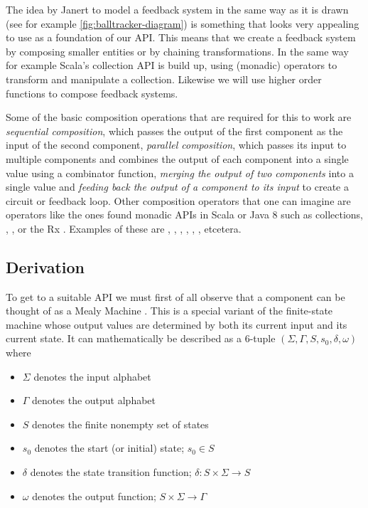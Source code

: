 The idea by Janert to model a feedback system in the same way as it is drawn (see for example \cref{fig:balltracker-diagram}) is something that looks very appealing to use as a foundation of our API. This means that we create a feedback system by composing smaller entities or by chaining transformations. In the same way for example Scala's collection API is build up, using (monadic) operators to transform and manipulate a collection. Likewise we will use higher order functions to compose feedback systems.

Some of the basic composition operations that are required for this to work are \textit{sequential composition}, which passes the output of the first component as the input of the second component, \textit{parallel composition}, which passes its input to multiple components and combines the output of each component into a single value using a combinator function, \textit{merging the output of two components} into a single value and \textit{feeding back the output of a component to its input} to create a circuit or feedback loop. Other composition operators that one can imagine are operators like the ones found monadic APIs in Scala or Java 8 such as collections, , ,  or the Rx \obs. Examples of these are , , , , , , etcetera.

\subsection{Derivation}
To get to a suitable API we must first of all observe that a component can be thought of as a Mealy Machine \cite{mealy1955-mealymachine}. This is a special variant of the finite-state machine whose output values are determined by both its current input and its current state. It can mathematically be described as a 6-tuple $(\Sigma, \Gamma, S, s_0, \delta, \omega)$ \cite{carroll1989-theoryoffiniteautomata} where

\begin{itemize}
	\item $\Sigma$ denotes the input alphabet
	\item $\Gamma$ denotes the output alphabet
	\item $S$ denotes the finite nonempty set of states
	\item $s_0$ denotes the start (or initial) state; $s_0 \in S$
	\item $\delta$ denotes the state transition function; $\delta: S \times \Sigma \rightarrow S$
	\item $\omega$ denotes the output function; $S \times \Sigma \rightarrow \Gamma$
\end{itemize}

